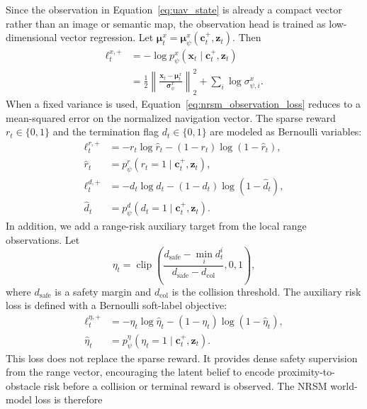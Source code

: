 \documentclass{article}
\begin{document}
Since the observation in Equation~\eqref{eq:uav_state} is already a compact vector rather than an image or semantic map, the observation head is trained as low-dimensional vector regression. Let $\boldsymbol{\mu}^{x}_{t}=\boldsymbol{\mu}_{\psi}^{x}(\mathbf c_t^+,\mathbf z_t)$. Then
\begin{align}
\ell^{x,+}_{t}
&=
-\log p_{\psi}^{x}(\mathbf x_t\mid \mathbf c_t^+,\mathbf z_t)
\nonumber\\
&=
\frac{1}{2}
\left\|
\frac{\mathbf x_t-\boldsymbol{\mu}^{x}_{t}}
{\boldsymbol{\sigma}_{\psi}^{x}}
\right\|_2^2
+
\sum_i \log \sigma_{\psi,i}^{x}.
\label{eq:nrsm_observation_loss}
\end{align}
When a fixed variance is used, Equation~\eqref{eq:nrsm_observation_loss} reduces to a mean-squared error on the normalized navigation vector. The sparse reward $r_t\in\{0,1\}$ and the termination flag $d_t\in\{0,1\}$ are modeled as Bernoulli variables:
\begin{align}
\ell^{r,+}_{t}
&=
-r_t\log \hat r_t
-(1-r_t)\log(1-\hat r_t),
\label{eq:nrsm_reward_loss}\\
\hat r_t
&=
p_{\psi}^{r}(r_t=1\mid\mathbf c_t^+,\mathbf z_t),
\nonumber\\
\ell^{d,+}_{t}
&=
-d_t\log \hat d_t
-(1-d_t)\log(1-\hat d_t),
\label{eq:nrsm_done_loss}\\
\hat d_t
&=
p_{\psi}^{d}(d_t=1\mid\mathbf c_t^+,\mathbf z_t).
\nonumber
\end{align}
In addition, we add a range-risk auxiliary target from the local range observations. Let
\begin{equation}
\eta_t
=
\operatorname{clip}
\left(
\frac{d_{\mathrm{safe}}-\min_i d_t^i}
{d_{\mathrm{safe}}-d_{\mathrm{col}}},
0,1
\right),
\label{eq:range_risk_target}
\end{equation}
where $d_{\mathrm{safe}}$ is a safety margin and $d_{\mathrm{col}}$ is the collision threshold. The auxiliary risk loss is defined with a Bernoulli soft-label objective:
\begin{align}
\ell^{\eta,+}_{t}
&=
-\eta_t\log \hat\eta_t
-(1-\eta_t)\log(1-\hat\eta_t),
\label{eq:range_risk_loss}\\
\hat\eta_t
&=
p_{\psi}^{\eta}(\eta_t=1\mid\mathbf c_t^+,\mathbf z_t).
\nonumber
\end{align}
This loss does not replace the sparse reward. It provides dense safety supervision from the range vector, encouraging the latent belief to encode proximity-to-obstacle risk before a collision or terminal reward is observed. The NRSM world-model loss is therefore
\end{document}
